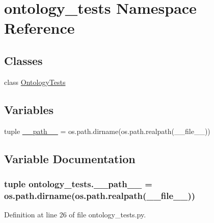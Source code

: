 \hypertarget{namespaceontology__tests}{\section{ontology\-\_\-tests Namespace Reference}
\label{namespaceontology__tests}
}
\subsection*{Classes}
\begin{DoxyCompactItemize}
\item 
class \hyperlink{classontology__tests_1_1OntologyTests}{Ontology\-Tests}
\end{DoxyCompactItemize}
\subsection*{Variables}
\begin{DoxyCompactItemize}
\item 
tuple \hyperlink{namespaceontology__tests_a721386dadabcf5024ef40d9a22c27ece}{\-\_\-\-\_\-path\-\_\-\-\_\-} = os.\-path.\-dirname(os.\-path.\-realpath(\-\_\-\-\_\-file\-\_\-\-\_\-))
\end{DoxyCompactItemize}


\subsection{Variable Documentation}
\hypertarget{namespaceontology__tests_a721386dadabcf5024ef40d9a22c27ece}{
\subsubsection[{\-\_\-\-\_\-path\-\_\-\-\_\-}]{\setlength{\rightskip}{0pt plus 5cm}tuple ontology\-\_\-tests.\-\_\-\-\_\-path\-\_\-\-\_\- = os.\-path.\-dirname(os.\-path.\-realpath(\-\_\-\-\_\-file\-\_\-\-\_\-))}}\label{namespaceontology__tests_a721386dadabcf5024ef40d9a22c27ece}


Definition at line 26 of file ontology\-\_\-tests.\-py.


